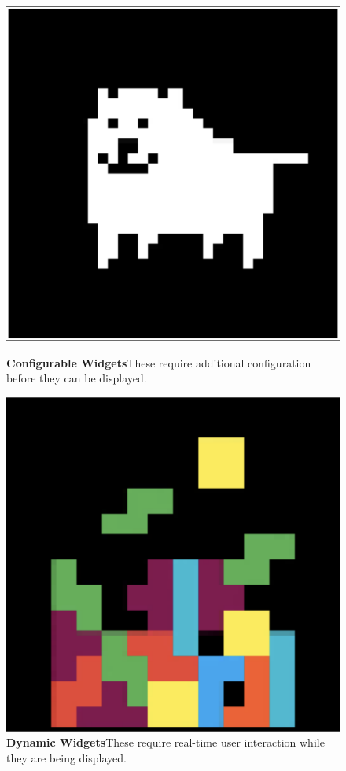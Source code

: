 \begin{figure}[h]
\begin{minipage}[b]{0.32\textwidth}
        \includegraphics[width=\textwidth]{tesi/img/stylized_widgets/image.png}
        \caption*{\textbf{Configurable Widgets}\newline These require additional configuration before they can be displayed.} 
    \end{minipage}
    \begin{minipage}[b]{0.32\textwidth}
        \centering
        \includegraphics[width=\textwidth]{tesi/img/stylized_widgets/tetris.png}
        \caption*{\textbf{Dynamic Widgets}\newline These require real-time user interaction while they are being displayed.}
    \end{minipage}
\end{figure}

